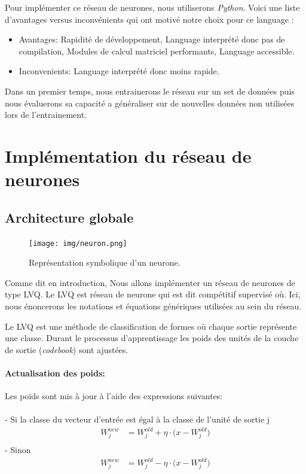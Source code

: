 \documentclass[11pt]{article}
\begin{document}
Pour implémenter ce r\'eseau de neurones, nous utiliserons {\em Python}.
Voici une liste d'avantages versus inconv\'enients qui ont motiv\'e notre choix
pour ce language :
\begin{itemize}
	\item Avantages:
		\subitem Rapidit\'e de d\'eveloppement,
		\subitem Language interpr\'et\'e donc pas de compilation,
		\subitem Modules de calcul matriciel performants,
		\subitem Language accessible.
	\item Inconvenients:
		\subitem Language interpr\'et\'e donc moins rapide. \\
\end{itemize}

Dans un premier temps, nous entrainerons le r\'eseau sur un set de donn\'ees puis
nous \'evaluerons sa capacit\'e a g\'en\'eraliser sur de nouvelles donn\'ees non utilis\'ees
lors de l'entrainement.
\section{Impl\'ementation du r\'eseau de neurones}
\subsection{Architecture globale}
\begin{figure}[htp]
	\centering
	\texttt{[image: img/neuron.png]}
	\caption{Repr\'esentation symbolique d'un neurone.}
\end{figure}

Comme dit en introduction, Nous allons impl\'ementer un r\'eseau de neurones de type LVQ. Le LVQ est r\'eseau de neurone qui est dit comp\'etitif supervis\'e o\`u. 
 Ici, nous \'enoncerons les notations et
\'equations g\'en\'eriques utilis\'ees au sein du r\'eseau.

Le LVQ est une m\'ethode de classification de formes o\`u chaque sortie repr\'esente une classe. Durant le processus d'apprentissage les poids des unit\'es de la couche de sortie (\emph{codebook}) sont ajust\'ees. 



\paragraph{Actualisation des poids:} Les poids sont mis \`a jour 
\`a l'aide des expressions suivantes:\\
\\
- Si la classe du vecteur d'entr\'ee est \'egal \`a la classe de l'unit\'e de sortie j 
\begin{equation}
	\begin{aligned}
		W_j^{new} &= W_j^{old} + \eta\cdot\bigg(x - W_j^{old} \bigg)\\
	\end{aligned}
\end{equation}
- Sinon
\begin{equation}
	\begin{aligned}
		W_j^{new} &= W_j^{old} - \eta\cdot\bigg(x - W_j^{old} \bigg)\\
	\end{aligned}
\end{equation}
\end{document}
